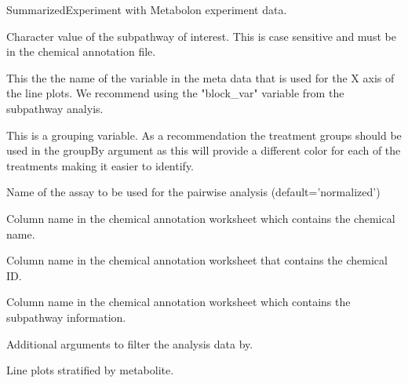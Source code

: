 \documentclass[a4paper]{book}
\begin{document}
\begin{Arguments}
\begin{ldescription}
\item[\code{data}] SummarizedExperiment with Metabolon experiment data.

\item[\code{subpathway}] Character value of the subpathway of interest. This is case
sensitive and must be in the chemical annotation file.

\item[\code{block\_var}] This the the name of the variable in the meta data that is
used for the X axis of the line plots. We recommend using the "block\_var"
variable from the subpathway analyis.

\item[\code{treat\_var}] This is a grouping variable. As a recommendation the
treatment groups should be used in the groupBy argument as this will provide
a different color for each of the treatments making it easier to identify.

\item[\code{Assay}] Name of the assay to be used for the pairwise analysis
(default='normalized')

\item[\code{CHEMICAL\_NAME}] Column name in the chemical annotation worksheet which
contains the chemical name.

\item[\code{CHEM\_ID}] Column name in the chemical annotation worksheet that contains
the chemical ID.

\item[\code{SUB\_PATHWAY}] Column name in the chemical annotation worksheet which
contains the subpathway information.

\item[\code{...}] Additional arguments to filter the analysis data by.
\end{ldescription}
\end{Arguments}
%
\begin{Value}
Line plots stratified by metabolite.
\end{Value}
%
\end{document}
